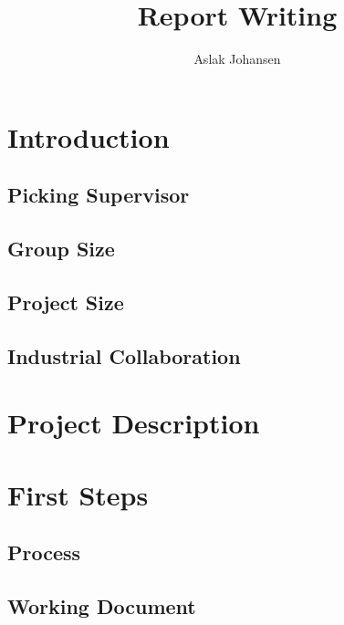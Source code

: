 \documentclass[a4paper]{memoir}
\title{Report Writing \\ \scalebox{0.85}{for Software BSc and MSc Projects}}
\author{Aslak Johansen}
\begin{document}
\maketitle
\tableofcontents

\chapter{Introduction}

\section{Picking Supervisor}

\section{Group Size}

\section{Project Size}

\section{Industrial Collaboration}

\chapter{Project Description}

\chapter{First Steps}

\section{Process}

\section{Working Document}
\end{document}
